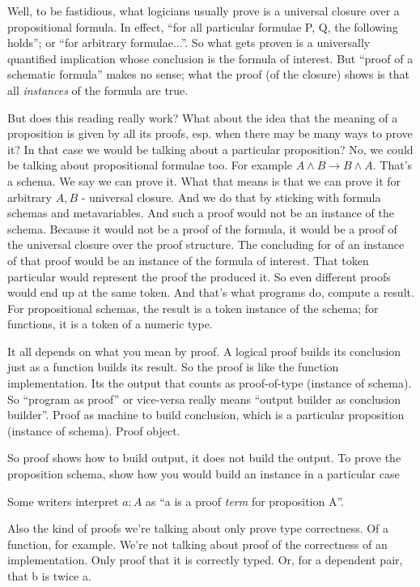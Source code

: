 \documentclass{article}
\begin{document}
Well, to be fastidious, what logicians usually prove is a universal
closure over a propositional formula. In effect, ``for all particular
formulae P, Q, the following holds''; or ``for arbitrary
formulae...''. So what gets proven is a universally quantified
implication whose conclusion is the formula of interest. But ``proof
of a schematic formula'' makes no sense; what the proof (of the
closure) shows is that all \textit{instances} of the formula are true.

But does this reading really work? What about the idea that the
meaning of a proposition is given by all its proofs, esp. when there
may be many ways to prove it? In that case we would be talking about a
particular proposition? No, we could be talking about propositional
formulae too. For example \(A\land B\rightarrow B\land A\). That's a
schema. We say we can prove it. What that means is that we can prove
it for arbitrary \(A, B\) - universal closure. And we do that by
sticking with formula schemas and metavariables. And such a proof
would not be an instance of the schema. Because it would not be a
proof of the formula, it would be a proof of the universal closure
over the proof structure. The concluding for of an instance of that
proof would be an instance of the formula of interest. That token
particular would represent the proof the produced it. So even
different proofs would end up at the same token. And that's what
programs do, compute a result. For propositional schemas, the result
is a token instance of the schema; for functions, it is a token of a
numeric type.

It all depends on what you mean by proof. A logical proof builds its
conclusion just as a function builds its result. So the proof is like
the function implementation. Its the output that counts as
proof-of-type (instance of schema). So ``program as proof'' or
vice-versa really means ``output builder as conclusion builder''.
Proof as machine to build conclusion, which is a particular
proposition (instance of schema). Proof object.

So proof shows how to build output, it does not build the output. To
prove the proposition schema, show how you would build an instance in
a particular case

Some writers interpret \(a:A\) as ``a is a proof \textit{term} for
proposition A''.

Also the kind of proofs we're talking about only prove type
correctness. Of a function, for example. We're not talking about proof
of the correctness of an implementation. Only proof that it is correctly
typed.  Or, for a dependent pair, that b is twice a.
\end{document}
